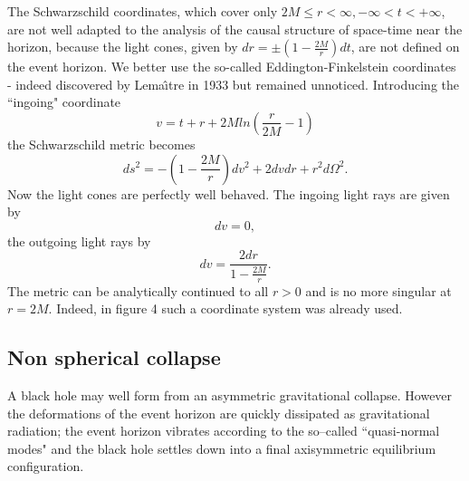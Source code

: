 \documentclass{lamuphys}
\begin{document}
The Schwarzschild coordinates, which cover only 
$2M \le r < \infty , - \infty < t < + \infty $, are not well adapted to the 
analysis of the causal structure of
space-time near the horizon,  because the light cones, given by $dr = \pm
(1-\frac{2M}{r})dt$, are not defined on the event horizon. We better use the
so-called Eddington-Finkelstein coordinates - indeed discovered by 
Lema\^{\i}tre in
1933 but remained unnoticed. Introducing the ``ingoing" coordinate 
\begin{equation}
v = t+r+2Mln(\frac{r}{2M}-1)    
\end{equation}
 the Schwarzschild metric becomes 
\begin{equation}
 ds^2 = - (1-\frac{2M}{r})dv^2 + 2 dvdr + r^2d\Omega^2.
\end{equation}
Now the light cones are perfectly well behaved. The ingoing light rays are
given by 
\begin{equation}
dv = 0, 
\end{equation}
the outgoing light rays by 
\begin{equation}
dv = \frac{2dr}{1-\frac{2M}{r}}.
\end{equation}
The metric can be analytically continued to all $r>0$ and
is no more singular at $r=2M$.
Indeed, in figure 4 such a coordinate system was already used.


\subsection {Non spherical collapse}
A black hole may well form from an asymmetric gravitational collapse. However
the deformations of the event horizon are quickly dissipated as 
gravitational radiation; the event horizon vibrates according to the so--called
``quasi-normal modes" and the black hole settles down into a final axisymmetric
equilibrium configuration.  
\end{document}
